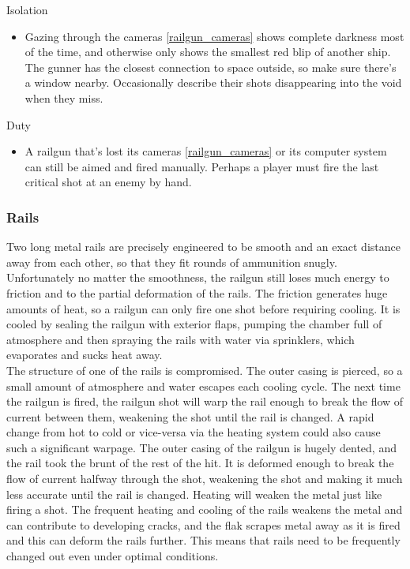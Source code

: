 \documentclass[a4paper]{article}
\begin{document}
\begin{minipage}[t]{0.4\linewidth}
Isolation
\begin{itemize}
\item Gazing through the cameras \ref{railgun_cameras} shows complete darkness most of the time, and otherwise only shows the smallest red blip of another ship. The gunner has the closest connection to space outside, so make sure there's a window nearby. Occasionally describe their shots disappearing into the void when they miss.
\end{itemize}
\end{minipage}
\begin{minipage}[t]{0.4\linewidth}
Duty
\begin{itemize}
\item A railgun that's lost its cameras \ref{railgun_cameras} or its computer system can still be aimed and fired manually. Perhaps a player must fire the last critical shot at an enemy by hand. 
\end{itemize}
\end{minipage}

\hspace{-18pt} \subsubsection{Rails} \label{railgun_rails} \vspace{-0.2cm}
Two long metal rails are precisely engineered to be smooth and an exact distance away from each other, so that they fit rounds of ammunition snugly. Unfortunately no matter the smoothness, the railgun still loses much energy to friction and to the partial deformation of the rails. The friction generates huge amounts of heat, so a railgun can only fire one shot before requiring cooling. It is cooled by sealing the railgun with exterior flaps, pumping the chamber full of atmosphere and then spraying the rails with water via sprinklers, which evaporates and sucks heat away.  
\\ \pbhw
{The structure of one of the rails is compromised. The outer casing is pierced, so a small amount of atmosphere and water escapes each cooling cycle. \newline \hspace{-3pt} The next time the railgun is fired, the railgun shot will warp the rail enough to break the flow of current between them, weakening the shot until the rail is changed. A rapid change from hot to cold or vice-versa via the heating system could also cause such a significant warpage.}
{The outer casing of the railgun is hugely dented, and the rail took the brunt of the rest of the hit. It is deformed enough to break the flow of current halfway through the shot, weakening the shot and making it much less accurate until the rail is changed.}
{Heating will weaken the metal just like firing a shot.}
{The frequent heating and cooling of the rails weakens the metal and can contribute to developing cracks, and the flak scrapes metal away as it is fired and this can deform the rails further. This means that rails need to be frequently changed out even under optimal conditions.}
\end{document}
